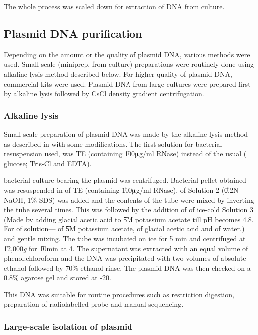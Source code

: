 The whole process was scaled down for extraction of DNA from
 culture.

\subsection{Plasmid DNA purification}

Depending on the amount or the quality of plasmid DNA, various
methods were used. Small-scale (miniprep, from  culture)
preparations were routinely done using alkaline lysis method
described below. For higher quality of plasmid DNA, commercial
kits were used. Plasmid DNA from large cultures were prepared
first by alkaline lysis followed by CsCl density gradient
centrifugation.

\subsubsection{Alkaline lysis}

Small-scale preparation of plasmid DNA was made by the alkaline
lysis method \citep{Birnboin1979} as described in
\citet{Sambrook1989} with some modifications. The first solution
for bacterial resuspension used, was TE (containing
\U{100}{$\muup$g/ml} RNase) instead of the usual ( glucose;
 Tris-Cl and  EDTA).

 bacterial culture bearing the plasmid was centrifuged.
Bacterial pellet obtained was resuspended in  of TE
(containing \U{100}{$\muup$g/ml} RNase).  of Solution 2
(\U{0.2}{N} NaOH, 1\% SDS) was added and the contents of the tube
were mixed by inverting the tube several times. This was followed
by the addition of  of ice-cold Solution 3 (Made by
adding glacial acetic acid to \U{5}{M} potassium acetate till pH
becomes 4.8. For  of solution--- of \U{5}{M}
potassium acetate,  of glacial acetic acid and 
of water.) and gentle mixing. The tube was incubated on ice for 5
min and centrifuged at \U{12,000}{\emph{g}} for \U{10}{min} at
4\dg. The supernatant was extracted with an equal volume of
phenol:chloroform and the DNA was precipitated with two volumes of
absolute ethanol followed by 70\% ethanol rinse. The plasmid DNA
was then checked on a 0.8\% agarose gel and stored at -20\dg.

This DNA was suitable for routine procedures such as restriction
digestion, preparation of radiolabelled probe and manual
sequencing.

\subsubsection{Large-scale isolation of plasmid}

